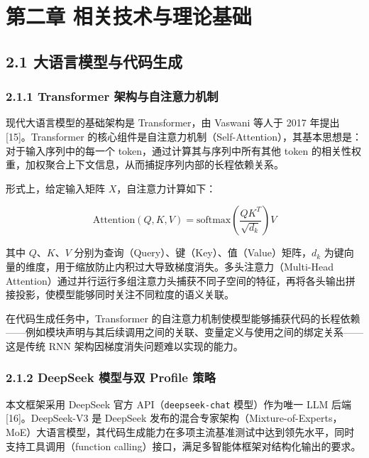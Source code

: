 \section{第二章
相关技术与理论基础}\label{ux7b2cux4e8cux7ae0-ux76f8ux5173ux6280ux672fux4e0eux7406ux8bbaux57faux7840}

\subsection{2.1
大语言模型与代码生成}\label{ux5927ux8bedux8a00ux6a21ux578bux4e0eux4ee3ux7801ux751fux6210}

\subsubsection{2.1.1 Transformer
架构与自注意力机制}\label{transformer-ux67b6ux6784ux4e0eux81eaux6ce8ux610fux529bux673aux5236}

现代大语言模型的基础架构是 Transformer，由 Vaswani 等人于 2017
年提出{[}15{]}。Transformer
的核心组件是自注意力机制（Self-Attention），其基本思想是：对于输入序列中的每一个
token，通过计算其与序列中所有其他 token
的相关性权重，加权聚合上下文信息，从而捕捉序列内部的长程依赖关系。

形式上，给定输入矩阵 \(X\)，自注意力计算如下：

\[\text{Attention}(Q, K, V) = \text{softmax}\left(\frac{QK^T}{\sqrt{d_k}}\right)V\]

其中 \(Q\)、\(K\)、\(V\)
分别为查询（Query）、键（Key）、值（Value）矩阵，\(d_k\)
为键向量的维度，用于缩放防止内积过大导致梯度消失。多头注意力（Multi-Head
Attention）通过并行运行多组注意力头捕获不同子空间的特征，再将各头输出拼接投影，使模型能够同时关注不同粒度的语义关联。

在代码生成任务中，Transformer
的自注意力机制使模型能够捕获代码的长程依赖------例如模块声明与其后续调用之间的关联、变量定义与使用之间的绑定关系------这是传统
RNN 架构因梯度消失问题难以实现的能力。

\subsubsection{2.1.2 DeepSeek 模型与双 Profile
策略}\label{deepseek-ux6a21ux578bux4e0eux53cc-profile-ux7b56ux7565}

本文框架采用 DeepSeek 官方 API（\texttt{deepseek-chat} 模型）作为唯一
LLM 后端{[}16{]}。DeepSeek-V3 是 DeepSeek
发布的混合专家架构（Mixture-of-Experts，MoE）大语言模型，其代码生成能力在多项主流基准测试中达到领先水平，同时支持工具调用（function
calling）接口，满足多智能体框架对结构化输出的要求。

